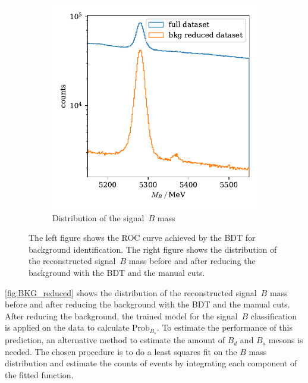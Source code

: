 \begin{figure}
\begin{subfigure}{0.5\textwidth}
        \includegraphics[width=\textwidth]{images/BKG_reduced.pdf}
        \caption{Distribution of the signal~$B$ mass}
        \label{fig:BKG_reduced}
    \end{subfigure}%
    \caption{The left figure shows the ROC curve achieved by the BDT for background identification. The right figure shows the distribution of the reconstructed signal~$B$ mass before and after reducing the background with the BDT and the manual cuts.}
\end{figure}

\autoref{fig:BKG_reduced} shows the distribution of the reconstructed signal~$B$ mass before and after reducing the background with the BDT and the manual cuts.
After reducing the background, the trained model for the signal~$B$ classification is applied on the data to calculate $\text{Prob}_{B_s}$.
To estimate the performance of this prediction, an alternative method to estimate the amount of $B_d$ and $B_s$ mesons is needed.
The chosen procedure is to do a least squares fit on the $B$ mass distribution and estimate the counts of events by integrating each component of the fitted function.

